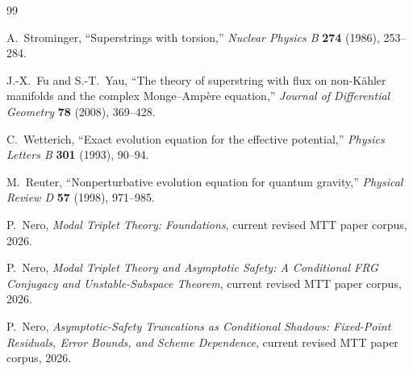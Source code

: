 \documentclass[11pt]{article}
\begin{document}
\begin{thebibliography}{99}

A.~Strominger,
``Superstrings with torsion,''
\emph{Nuclear Physics B} \textbf{274} (1986), 253--284.

J.-X.~Fu and S.-T.~Yau,
``The theory of superstring with flux on non-K\"ahler manifolds and the
complex Monge--Amp\`ere equation,''
\emph{Journal of Differential Geometry} \textbf{78} (2008), 369--428.

C.~Wetterich,
``Exact evolution equation for the effective potential,''
\emph{Physics Letters B} \textbf{301} (1993), 90--94.

M.~Reuter,
``Nonperturbative evolution equation for quantum gravity,''
\emph{Physical Review D} \textbf{57} (1998), 971--985.

P.~Nero,
\emph{Modal Triplet Theory: Foundations},
current revised MTT paper corpus, 2026.

P.~Nero,
\emph{Modal Triplet Theory and Asymptotic Safety: A Conditional FRG
Conjugacy and Unstable-Subspace Theorem},
current revised MTT paper corpus, 2026.

P.~Nero,
\emph{Asymptotic-Safety Truncations as Conditional Shadows: Fixed-Point
Residuals, Error Bounds, and Scheme Dependence},
current revised MTT paper corpus, 2026.

\end{thebibliography}
\end{document}
